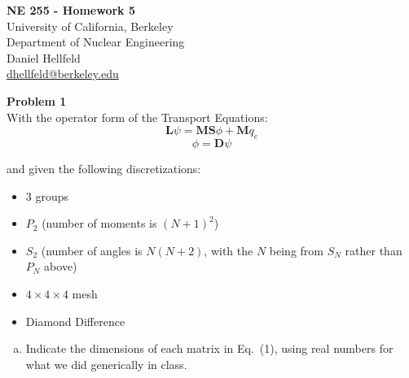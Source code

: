 \documentclass[10pt]{article}
\begin{document}
\begin{centering}
\textbf{\large NE 255 - Homework 5}\\
\vspace{10pt}
University of California, Berkeley\\
Department of Nuclear Engineering\\
\vspace{10pt}
Daniel Hellfeld\\
\href{mailto:dhellfeld@berkeley.edu}{dhellfeld@berkeley.edu}\\
\end{centering}






\vspace{20pt}
\noindent \textbf{Problem 1}\\
With the operator form of the Transport Equations:
%
\begin{equation}
    \textbf{L} \psi = \textbf{MS} \phi + \textbf{M} q_e
\end{equation}
\vspace{-17pt}
\begin{equation}
    \phi = \textbf{D}\psi
\end{equation}

and given the following discretizations:
%
\begin{itemize}
\setlength\itemsep{-3pt}
    \item 3 groups
    \item $P_2$ (number of moments is $(N + 1)^2$)
    \item $S_2$ (number of angles is $N(N + 2)$, with the $N$ being from $S_N$ rather than $P_N$ above)
    \item $4\times4\times4$ mesh
    \item Diamond Difference
\end{itemize}


\begin{enumerate}[(a)]
\item Indicate the dimensions of each matrix in Eq.~(1), using real numbers for what we did generically in class.
\end{enumerate}
\end{document}
